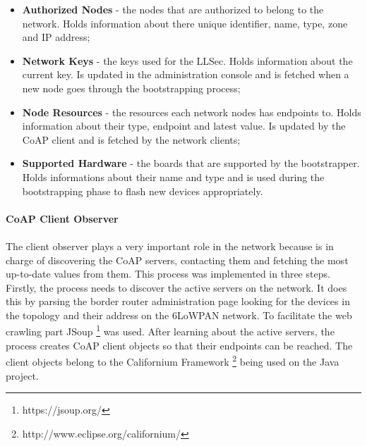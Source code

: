 \begin{itemize}
  \item \textbf{Authorized Nodes} - the nodes that are authorized to belong to the network. Holds information about there unique identifier, name, type, zone and IP address;
  \item \textbf{Network Keys} - the keys used for the \gls{LLSec}. Holds information about the current key. Is updated in the administration console and is fetched when a new node goes through the bootstrapping process;
  \item \textbf{Node Resources} - the resources each network nodes has endpoints to. Holds information about their type, endpoint and latest value. Is updated by the \gls{CoAP} client and is fetched by the network clients;
  \item \textbf{Supported Hardware} - the boards that are supported by the bootstrapper. Holds informations about their name and type and is used during the bootstrapping phase to flash new devices appropriately.
\end{itemize}


\paragraph{\textbf{CoAP Client Observer}}
\paragraph{}

The client observer plays a very important role in the network because is in charge of discovering the \gls{CoAP} servers, contacting them and fetching the most up-to-date values from them. This process was implemented in three steps. Firstly, the process needs to discover the active servers on the network. It does this by parsing the border router administration page looking for the devices in the topology and their address on the \gls{6LoWPAN} network. To facilitate the web crawling part JSoup \footnote{https://jsoup.org/} was used. After learning about the active servers, the process creates \gls{CoAP} client objects so that their endpoints can be reached. The client objects belong to the Californium Framework \footnote{http://www.eclipse.org/californium/} being used on the Java project.  

